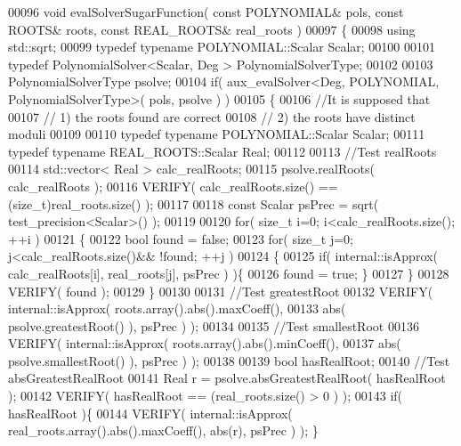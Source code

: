 \begin{DoxyCode}
00096 \textcolor{keywordtype}{void} evalSolverSugarFunction( \textcolor{keyword}{const} POLYNOMIAL& pols, \textcolor{keyword}{const} ROOTS& roots, \textcolor{keyword}{const} REAL\_ROOTS& real\_roots )
00097 \{
00098   \textcolor{keyword}{using} std::sqrt;
00099   \textcolor{keyword}{typedef} \textcolor{keyword}{typename} POLYNOMIAL::Scalar Scalar;
00100 
00101   \textcolor{keyword}{typedef} PolynomialSolver<Scalar, Deg >              PolynomialSolverType;
00102 
00103   PolynomialSolverType psolve;
00104   \textcolor{keywordflow}{if}( aux\_evalSolver<Deg, POLYNOMIAL, PolynomialSolverType>( pols, psolve ) )
00105   \{
00106     \textcolor{comment}{//It is supposed that}
00107     \textcolor{comment}{// 1) the roots found are correct}
00108     \textcolor{comment}{// 2) the roots have distinct moduli}
00109 
00110     \textcolor{keyword}{typedef} \textcolor{keyword}{typename} POLYNOMIAL::Scalar                 Scalar;
00111     \textcolor{keyword}{typedef} \textcolor{keyword}{typename} REAL\_ROOTS::Scalar                 Real;
00112 
00113     \textcolor{comment}{//Test realRoots}
00114     std::vector< Real > calc\_realRoots;
00115     psolve.realRoots( calc\_realRoots );
00116     VERIFY( calc\_realRoots.size() == (size\_t)real\_roots.size() );
00117 
00118     \textcolor{keyword}{const} Scalar psPrec = sqrt( test\_precision<Scalar>() );
00119 
00120     \textcolor{keywordflow}{for}( \textcolor{keywordtype}{size\_t} i=0; i<calc\_realRoots.size(); ++i )
00121     \{
00122       \textcolor{keywordtype}{bool} found = \textcolor{keyword}{false};
00123       \textcolor{keywordflow}{for}( \textcolor{keywordtype}{size\_t} j=0; j<calc\_realRoots.size()&& !found; ++j )
00124       \{
00125         \textcolor{keywordflow}{if}( internal::isApprox( calc\_realRoots[i], real\_roots[j], psPrec ) )\{
00126           found = \textcolor{keyword}{true}; \}
00127       \}
00128       VERIFY( found );
00129     \}
00130 
00131     \textcolor{comment}{//Test greatestRoot}
00132     VERIFY( internal::isApprox( roots.array().abs().maxCoeff(),
00133           abs( psolve.greatestRoot() ), psPrec ) );
00134 
00135     \textcolor{comment}{//Test smallestRoot}
00136     VERIFY( internal::isApprox( roots.array().abs().minCoeff(),
00137           abs( psolve.smallestRoot() ), psPrec ) );
00138 
00139     \textcolor{keywordtype}{bool} hasRealRoot;
00140     \textcolor{comment}{//Test absGreatestRealRoot}
00141     Real r = psolve.absGreatestRealRoot( hasRealRoot );
00142     VERIFY( hasRealRoot == (real\_roots.size() > 0 ) );
00143     \textcolor{keywordflow}{if}( hasRealRoot )\{
00144       VERIFY( internal::isApprox( real\_roots.array().abs().maxCoeff(), abs(r), psPrec ) );  \}

\end{DoxyCode}
